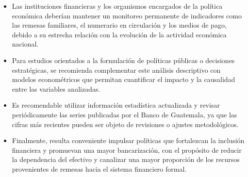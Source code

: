 \begin{itemize}
    \item Las instituciones financieras y los organismos encargados de la política económica deberían mantener un monitoreo permanente de indicadores como las remesas familiares, el numerario en circulación y los medios de pago, debido a su estrecha relación con la evolución de la actividad económica nacional.
    \item Para estudios orientados a la formulación de políticas públicas o decisiones estratégicas, se recomienda complementar este análisis descriptivo con modelos econométricos que permitan cuantificar el impacto y la causalidad entre las variables analizadas.
    \item Es recomendable utilizar información estadística actualizada y revisar periódicamente las series publicadas por el Banco de Guatemala, ya que las cifras más recientes pueden ser objeto de revisiones o ajustes metodológicos.
    \item Finalmente, resulta conveniente impulsar políticas que fortalezcan la inclusión financiera y promuevan una mayor bancarización, con el propósito de reducir la dependencia del efectivo y canalizar una mayor proporción de los recursos provenientes de remesas hacia el sistema financiero formal.
\end{itemize}
